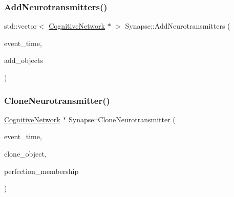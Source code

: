 \mbox{\label{classSynapse_a5ad01cc92c00d790b44472156065786e}} 
\subsubsection{\texorpdfstring{Add\+Neurotransmitters()}{AddNeurotransmitters()}}
{\footnotesize\ttfamily std\+::vector$<$ \mbox{\hyperlink{classCognitiveNetwork}{Cognitive\+Network}} $\ast$ $>$ Synapse\+::\+Add\+Neurotransmitters (\begin{DoxyParamCaption}\item[{std\+::chrono\+::time\+\_\+point$<$ \mbox{\hyperlink{universe_8h_a0ef8d951d1ca5ab3cfaf7ab4c7a6fd80}{Clock}} $>$}]{event\+\_\+time,  }\item[{std\+::vector$<$ \mbox{\hyperlink{classCognitiveNetwork}{Cognitive\+Network}} $\ast$$>$}]{add\+\_\+objects }\end{DoxyParamCaption})}

\mbox{\label{classSynapse_a1b52aa12cc7c28bfa2564e21ac17eb07}} 
\subsubsection{\texorpdfstring{Clone\+Neurotransmitter()}{CloneNeurotransmitter()}}
{\footnotesize\ttfamily \mbox{\hyperlink{classCognitiveNetwork}{Cognitive\+Network}} $\ast$ Synapse\+::\+Clone\+Neurotransmitter (\begin{DoxyParamCaption}\item[{std\+::chrono\+::time\+\_\+point$<$ \mbox{\hyperlink{universe_8h_a0ef8d951d1ca5ab3cfaf7ab4c7a6fd80}{Clock}} $>$}]{event\+\_\+time,  }\item[{\mbox{\hyperlink{classCognitiveNetwork}{Cognitive\+Network}} $\ast$}]{clone\+\_\+object,  }\item[{double}]{perfection\+\_\+membership }\end{DoxyParamCaption})}

\mbox{\label{classSynapse_a97c0db103754d337e28591f185c8379f}} 
